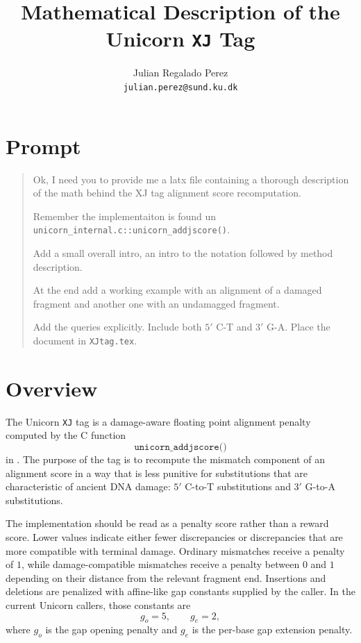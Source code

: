 \documentclass[11pt]{article}
\title{Mathematical Description of the Unicorn \texttt{XJ} Tag}
\author{Julian Regalado Perez\\\texttt{julian.perez@sund.ku.dk}}
\date{}
\begin{document}
\maketitle

\section{Prompt}
\begin{quote}
\ttfamily\raggedright
Ok, I need you to provide me a latx file containing a thorough description of
the math behind the XJ tag alignment score recomputation.

Remember the implementaiton is found un
\texttt{unicorn\_internal.c::unicorn\_addjscore()}.

Add a small overall intro, an intro to the notation followed by method
description.

At the end add a working example with an alignment of a damaged fragment and
another one with an undamagged fragment.

Add the queries explicitly. Include both $5'$ C-T and $3'$ G-A. Place the
document in \texttt{XJtag.tex}.
\end{quote}

\section{Overview}

The Unicorn \texttt{XJ} tag is a damage-aware floating point alignment penalty
computed by the C function
\[
\texttt{unicorn\_addjscore()}
\]
in . The purpose of the tag is to
recompute the mismatch component of an alignment score in a way that is less
punitive for substitutions that are characteristic of ancient DNA damage:
$5'$ C-to-T substitutions and $3'$ G-to-A substitutions.

The implementation should be read as a penalty score rather than a reward
score. Lower values indicate either fewer discrepancies or discrepancies that
are more compatible with terminal damage. Ordinary mismatches receive a penalty
of $1$, while damage-compatible mismatches receive a penalty between $0$ and
$1$ depending on their distance from the relevant fragment end. Insertions and
deletions are penalized with affine-like gap constants supplied by the caller.
In the current Unicorn callers, those constants are
\[
g_o = 5, \qquad g_e = 2,
\]
where $g_o$ is the gap opening penalty and $g_e$ is the per-base gap extension
penalty.
\end{document}
